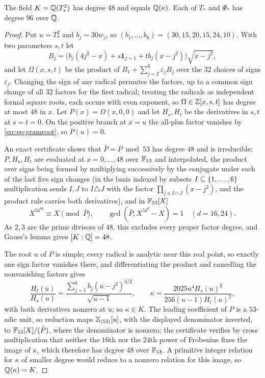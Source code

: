 \begin{theorem}\label{src:thm:gramdegree}
The field $K=\mathbb{Q}(T_*^2)$ has degree $48$ and equals $\mathbb{Q}(\kappa)$. Each of $T_*$ and $\Phi_*$ has degree
$96$ over $\mathbb{Q}$.
\end{theorem}

\begin{proof}
Put $u=T_*^2$ and $b_j=30w_j$, so $(b_1,\dots,b_6)=(30,15,20,15,24,10)$. With two parameters $s,t$ let
\[
 B_j=\bigl(b_j(4j^2-x)+s\mathbf1_{j=1}+tb_j(x-j^2)\bigr)\sqrt{x-j^2},
\]
and let $\Omega(x,s,t)$ be the product of $B_1+\sum_{j=2}^6\varepsilon_jB_j$ over the $32$ choices of signs
$\varepsilon_j$. Changing the sign of any radical permutes the factors, up to a common sign change of all
$32$ factors for the first radical; treating the radicals as independent formal square roots, each occurs
with even exponent, so $\Omega\in\mathbb{Z}[x,s,t]$ has degree at most $48$ in $x$. Let $P(x)=\Omega(x,0,0)$ and
let $H_s,H_t$ be the derivatives in $s,t$ at $s=t=0$. On the positive branch at $x=u$ the all-plus factor
vanishes by \eqref{src:eq:gramroot}, so $P(u)=0$.

An exact certificate shows that $\bar P=P\bmod53$ has degree $48$ and is irreducible: $P,H_s,H_t$ are
evaluated at $x=0,\dots,48$ over $\mathbb{F}_{53}$ and interpolated, the product over signs being formed by
multiplying successively by the conjugate under each of the last five sign changes (in the basis indexed by
subsets $I\subseteq\{1,\dots,6\}$ multiplication sends $I,J$ to $I\triangle J$ with the factor
$\prod_{j\in I\cap J}(x-j^2)$, and the product rule carries both derivatives), and in $\mathbb{F}_{53}[X]$
\[
 X^{53^{48}}\equiv X\pmod{\bar P},\qquad\gcd(\bar P,X^{53^d}-X)=1\quad(d=16,24).
\]
As $2,3$ are the prime divisors of $48$, this excludes every proper factor degree, and Gauss's lemma gives
$[K:\mathbb{Q}]=48$.

The root $u$ of $P$ is simple; every radical is analytic near this real point, so exactly one sign factor
vanishes there, and differentiating the product and cancelling the nonvanishing factors gives
\[
 \frac{H_t(u)}{H_s(u)}=\frac{\sum_{j=1}^6b_j(u-j^2)^{3/2}}{\sqrt{u-1}},\qquad
 \kappa=\frac{2025u^4H_s(u)^2}{256(u-1)H_t(u)^2},
\]
with both derivatives nonzero at $u$; so $\kappa\in K$. The leading coefficient of $P$ is a $53$-adic unit,
so reduction maps $\mathbb{Z}_{(53)}[u]$, with the displayed denominator inverted, to $\mathbb{F}_{53}[X]/(\bar P)$, where
the denominator is nonzero; the certificate verifies by cross multiplication that neither the $16$th nor
the $24$th power of Frobenius fixes the image of $\kappa$, which therefore has degree $48$ over $\mathbb{F}_{53}$. A
primitive integer relation for $\kappa$ of smaller degree would reduce to a nonzero relation for this image,
so $\mathbb{Q}(\kappa)=K$.


\end{proof}
